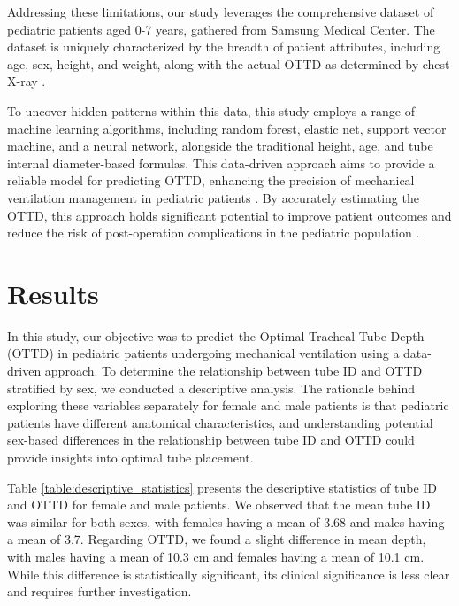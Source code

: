 \documentclass[11pt]{article}
\begin{document}
Addressing these limitations, our study leverages the comprehensive dataset of pediatric patients aged 0-7 years, gathered from Samsung Medical Center. The dataset is uniquely characterized by the breadth of patient attributes, including age, sex, height, and weight, along with the actual OTTD as determined by chest X-ray \cite{Kuzin2007FamilyMemberPD,OBoyle2014DevelopmentOL,Kerrey2009APC}. 

To uncover hidden patterns within this data, this study employs a range of machine learning algorithms, including random forest, elastic net, support vector machine, and a neural network, alongside the traditional height, age, and tube internal diameter-based formulas. This data-driven approach aims to provide a reliable model for predicting OTTD, enhancing the precision of mechanical ventilation management in pediatric patients \cite{Narula2018EnteralNT}. By accurately estimating the OTTD, this approach holds significant potential to improve patient outcomes and reduce the risk of post-operation complications in the pediatric population \cite{Ednick2008PostoperativeRO}.

\section*{Results}

In this study, our objective was to predict the Optimal Tracheal Tube Depth (OTTD) in pediatric patients undergoing mechanical ventilation using a data-driven approach. To determine the relationship between tube ID and OTTD stratified by sex, we conducted a descriptive analysis. The rationale behind exploring these variables separately for female and male patients is that pediatric patients have different anatomical characteristics, and understanding potential sex-based differences in the relationship between tube ID and OTTD could provide insights into optimal tube placement.

Table {}\ref{table:descriptive_statistics} presents the descriptive statistics of tube ID and OTTD for female and male patients. We observed that the mean tube ID was similar for both sexes, with females having a mean of 3.68 and males having a mean of 3.7. Regarding OTTD, we found a slight difference in mean depth, with males having a mean of 10.3 cm and females having a mean of 10.1 cm. While this difference is statistically significant, its clinical significance is less clear and requires further investigation.
\end{document}
